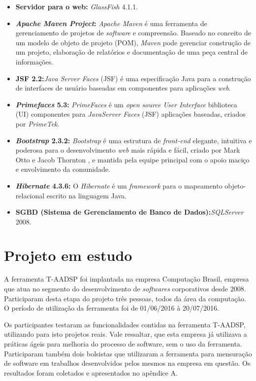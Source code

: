 \documentclass{acm_proc_article-sp}
\begin{document}
\begin{itemize}
\item \textbf{Servidor para o web:} \textit{GlassFish} 4.1.1. 
\item \textbf{\textit{Apache Maven Project}:} \textit{Apache Maven} é uma ferramenta de gerenciamento de projetos de \textit{software} e compreensão. Baseado no conceito de um modelo de objeto de projeto (POM), \textit{Maven} pode gerenciar construção de um projeto, elaboração de relatórios e documentação de uma peça central de informações.
\item \textbf{JSF 2.2:}\textit{Java Server Faces} (JSF) é uma especificação Java para a construção de interfaces de usuário baseadas em componentes para aplicações \textit{web}.
\item \textbf{\textit{Primefaces} 5.3:} \textit{PrimeFaces} é um \textit{open source User Interface} biblioteca (UI) componentes para \textit{JavaServer Faces} (JSF) aplicações baseadas, criados por \textit{PrimeTek}.  
\item \textbf{\textit{Bootstrap} 2.3.2:} \textit{Bootstrap} é uma estrutura de \textit{front-end} elegante, intuitiva e poderosa para o desenvolvimento \textit{web} mais rápida e fácil, criado por Mark Otto e Jacob Thornton , e mantida pela equipe principal com o apoio maciço e envolvimento da comunidade. 
\item \textbf{\textit{Hibernate} 4.3.6:} O \textit{Hibernate} é um \textit{framework} para o mapeamento objeto-relacional escrito na linguagem Java. 
\item \textbf{SGBD (Sistema de Gerenciamento de Banco de Dados):}\textit{SQLServer} 2008. 
\end{itemize}


\section{Projeto em estudo}
A ferramenta T-AADSP foi implantada na empresa Computação Brasil, empresa que atua no segmento do desenvolvimento de \textit{softwares} corporativos desde 2008. Participaram desta etapa do projeto três pessoas, todos da área da computação. O período de utilização da ferramenta foi de 01/06/2016 à 20/07/2016. 

Os participantes testaram as funcionalidades contidas na ferramenta T-AADSP, utilizando para isto projetos reais. Vale ressaltar, que esta empresa já utilizava a práticas ágeis para melhoria do processo de software, sem o uso da ferramenta. Participaram também dois bolsistas que utilizaram a ferramenta para mensuração de software em trabalhos desenvolvidos pelos mesmos na empresa em questão. Os resultados foram coletados e apresentados no apêndice A. 
\end{document}

